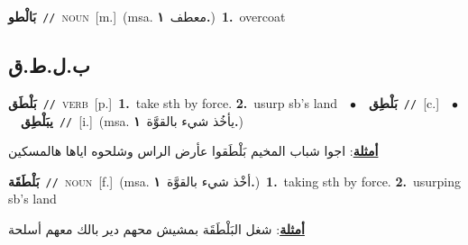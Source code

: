 \documentclass[10pt,a4paper,twoside]{article} %
\begin{document}
\begin{multicols}{2}
{\setlength\topsep{0pt}\textbf{\foreignlanguage{arabic}{بَالْطو}}\ {\color{gray}\texttt{//}\color{black}}\ \textsc{noun}\ [m.]\ \color{gray}(msa. \foreignlanguage{arabic}{معطف}~\foreignlanguage{arabic}{\textbf{١.}})\color{black}\ \textbf{1.}~overcoat\ } \vspace{2mm}

\vspace{-3mm}
\subsection*{\color{blue}\foreignlanguage{arabic}{ب.ل.ط.ق}\color{blue}{}} 

{\setlength\topsep{0pt}\textbf{\foreignlanguage{arabic}{بَلْطَق}}\ {\color{gray}\texttt{//}\color{black}}\ \textsc{verb}\ [p.]\ \textbf{1.}~take sth by force.  \textbf{2.}~usurp sb's land\ \ $\bullet$\ \ \setlength\topsep{0pt}\textbf{\foreignlanguage{arabic}{بَلْطِق}}\ {\color{gray}\texttt{//}\color{black}}\ [c.]\ \ $\bullet$\ \ \setlength\topsep{0pt}\textbf{\foreignlanguage{arabic}{يبَلْطِق}}\ {\color{gray}\texttt{//}\color{black}}\ [i.]\ \color{gray}(msa. \foreignlanguage{arabic}{يأخُذ شيء بالقوَّة}~\foreignlanguage{arabic}{\textbf{١.}})\color{black}\  \begin{flushright}\color{gray}\foreignlanguage{arabic}{\textbf{\underline{\foreignlanguage{arabic}{أمثلة}}}: اجوا شباب المخيم بَلْطَقوا عأرض الراس وشلحوه اياها هالمسكين}\end{flushright}\color{black}} \vspace{2mm}

{\setlength\topsep{0pt}\textbf{\foreignlanguage{arabic}{بَلْطَقَة}}\ {\color{gray}\texttt{//}\color{black}}\ \textsc{noun}\ [f.]\ \color{gray}(msa. \foreignlanguage{arabic}{أخْذ شيء بالقوَّة}~\foreignlanguage{arabic}{\textbf{١.}})\color{black}\ \textbf{1.}~taking sth by force.  \textbf{2.}~usurping sb's land\  \begin{flushright}\color{gray}\foreignlanguage{arabic}{\textbf{\underline{\foreignlanguage{arabic}{أمثلة}}}: شغل البَلْطَقَة بمشيش محهم دير بالك معهم أسلحة}\end{flushright}\color{black}} \vspace{2mm}


\end{multicols}
\end{document}
